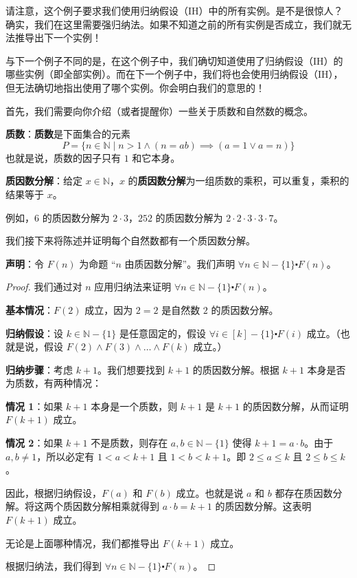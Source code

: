 请注意，这个例子要求我们使用归纳假设（IH）中的所有实例。是不是很惊人？确实，我们在这里需要强归纳法。如果不知道之前的所有实例是否成立，我们就无法推导出下一个实例！

与下一个例子不同的是，在这个例子中，我们确切知道使用了归纳假设（IH）的哪些实例（即全部实例）。而在下一个例子中，我们将也会使用归纳假设（IH），但无法确切地指出使用了哪个实例。你会明白我们的意思的！\\

\begin{example}
    首先，我们需要向你介绍（或者提醒你）一些关于质数和自然数的概念。

    \textbf{质数}：\textbf{质数}是下面集合的元素
    \[P = \{n \in \mathbb{N} \mid n > 1 \land (n = ab) \implies (a = 1 \lor a = n)\}\]
    也就是说，质数的因子只有 $1$ 和它本身。

    \textbf{质因数分解}：给定 $x \in \mathbb{N}$，$x$ 的\textbf{质因数分解}为一组质数的乘积，可以重复，乘积的结果等于 $x$。

    例如，$6$ 的质因数分解为 $2 \cdot 3$，$252$ 的质因数分解为 $2 \cdot 2 \cdot 3 \cdot 3 \cdot 7$。

    我们接下来将陈述并证明每个自然数都有一个质因数分解。

    \textbf{声明}：令 $F(n)$ 为命题 ``$n$ 由质因数分解''。我们声明 $\forall n \in \mathbb{N} - \{1\} \centerdot F(n)$。
\end{example}

\begin{proof}
    我们通过对 $n$ 应用归纳法来证明 $\forall n \in \mathbb{N} - \{1\} \centerdot F(n)$。

    \textbf{基本情况}：$F(2)$ 成立，因为 $2 = 2$ 是自然数 $2$ 的质因数分解。

    \textbf{归纳假设}：设 $k \in \mathbb{N} - \{1\}$ 是任意固定的，假设 $\forall i \in [k]-\{1\} \centerdot F(i)$ 成立。（也就是说，假设 $F(2) \land F(3) \land \dots \land F(k)$ 成立。）

    \textbf{归纳步骤}：考虑 $k+1$。我们想要找到 $k+1$ 的质因数分解。根据 $k+1$ 本身是否为质数，有两种情况：

    \textbf{情况 1}：如果 $k+1$ 本身是一个质数，则 $k+1$ 是 $k+1$ 的质因数分解，从而证明 $F(k+1)$ 成立。

    \textbf{情况 2}：如果 $k+1$ 不是质数，则存在 $a, b \in \mathbb{N} - \{1\}$ 使得 $k+1 = a \cdot b$。由于 $a, b \neq 1$，所以必定有 $1 < a < k+1$ 且 $1 < b < k+1$。即 $2 \le a \le k$ 且 $2 \le b \le k$。

    因此，根据归纳假设，$F(a)$ 和 $F(b)$ 成立。也就是说 $a$ 和 $b$ 都存在质因数分解。将这两个质因数分解相乘就得到 $a \cdot b = k+1$ 的质因数分解。这表明 $F(k+1)$ 成立。

    无论是上面哪种情况，我们都推导出 $F(k+1)$ 成立。

    根据归纳法，我们得到 $\forall n \in \mathbb{N} - \{1\} \centerdot F(n)$。
\end{proof}

